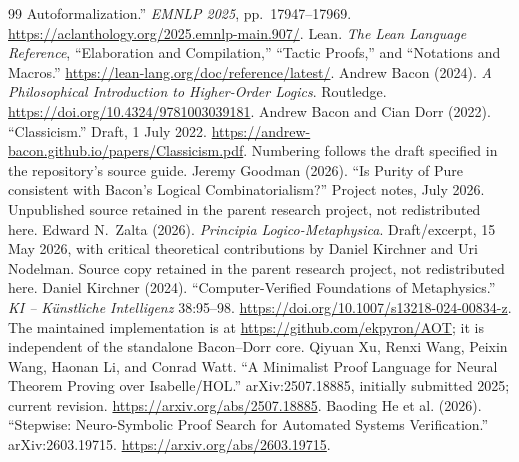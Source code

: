 \documentclass[12pt,leqno]{article}
\begin{document}
\begin{singlespace}
\begin{thebibliography}{99}
Autoformalization.'' \emph{EMNLP 2025}, pp.~17947--17969.
\url{https://aclanthology.org/2025.emnlp-main.907/}.
 Lean. \emph{The Lean Language Reference}, ``Elaboration
and Compilation,'' ``Tactic Proofs,'' and ``Notations and Macros.''
\url{https://lean-lang.org/doc/reference/latest/}.
 Andrew Bacon (2024).
\emph{A Philosophical Introduction to Higher-Order Logics}. Routledge.
\url{https://doi.org/10.4324/9781003039181}.
 Andrew Bacon and Cian Dorr (2022). ``Classicism.'' Draft,
1 July 2022. \url{https://andrew-bacon.github.io/papers/Classicism.pdf}.
Numbering follows the draft specified in the repository's source guide.
 Jeremy Goodman (2026). ``Is Purity of Pure consistent with
Bacon's Logical Combinatorialism?'' Project notes, July 2026.
Unpublished source retained in the parent research project, not redistributed here.
 Edward N.\ Zalta (2026). \emph{Principia Logico-Metaphysica}.
Draft/excerpt, 15 May 2026, with critical theoretical contributions by
Daniel Kirchner and Uri Nodelman. Source copy retained in the parent
research project, not redistributed here.
 Daniel Kirchner (2024). ``Computer-Verified Foundations
of Metaphysics.'' \emph{KI -- K\"unstliche Intelligenz} 38:95--98.
\url{https://doi.org/10.1007/s13218-024-00834-z}.
The maintained implementation is at \url{https://github.com/ekpyron/AOT};
it is independent of the standalone Bacon--Dorr core.
 Qiyuan Xu, Renxi Wang, Peixin Wang, Haonan Li, and Conrad
Watt. ``A Minimalist Proof Language for Neural Theorem Proving over
Isabelle/HOL.'' arXiv:2507.18885, initially submitted 2025; current revision.
\url{https://arxiv.org/abs/2507.18885}.
 Baoding He et al. (2026). ``Stepwise: Neuro-Symbolic
Proof Search for Automated Systems Verification.'' arXiv:2603.19715.
\url{https://arxiv.org/abs/2603.19715}.
\end{thebibliography}
\end{singlespace}
\end{document}
